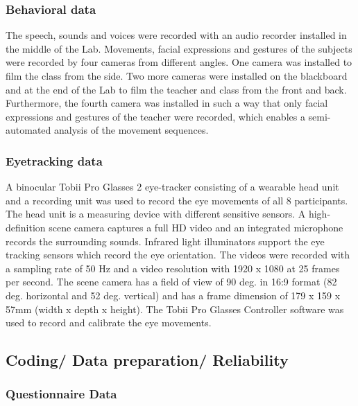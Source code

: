 \documentclass[
  english,
  man,floatsintext]{apa6}
\begin{document}
\hypertarget{behavioral-data}{%
\subsubsection{Behavioral data}\label{behavioral-data}}

The speech, sounds and voices were recorded with an audio recorder installed in the middle of the Lab. Movements, facial expressions and gestures of the subjects were recorded by four cameras from different angles. One camera was installed to film the class from the side. Two more cameras were installed on the blackboard and at the end of the Lab to film the teacher and class from the front and back. Furthermore, the fourth camera was installed in such a way that only facial expressions and gestures of the teacher were recorded, which enables a semi-automated analysis of the movement sequences.

\hypertarget{eyetracking-data}{%
\subsubsection{Eyetracking data}\label{eyetracking-data}}

A binocular Tobii Pro Glasses 2 eye-tracker consisting of a wearable head unit and a recording unit was used to record the eye movements of all 8 participants. The head unit is a measuring device with different sensitive sensors. A high-definition scene camera captures a full HD video and an integrated microphone records the surrounding sounds. Infrared light illuminators support the eye tracking sensors which record the eye orientation. The videos were recorded with a sampling rate of 50 Hz and a video resolution with 1920 x 1080 at 25 frames per second. The scene camera has a field of view of 90 deg. in 16:9 format (82 deg. horizontal and 52 deg. vertical) and has a frame dimension of 179 x 159 x 57mm (width x depth x height). The Tobii Pro Glasses Controller software was used to record and calibrate the eye movements.

\hypertarget{coding-data-preparation-reliability}{%
\subsection{Coding/ Data preparation/ Reliability}\label{coding-data-preparation-reliability}}

\hypertarget{questionnaire-data-1}{%
\subsubsection{Questionnaire Data}\label{questionnaire-data-1}}
\end{document}
